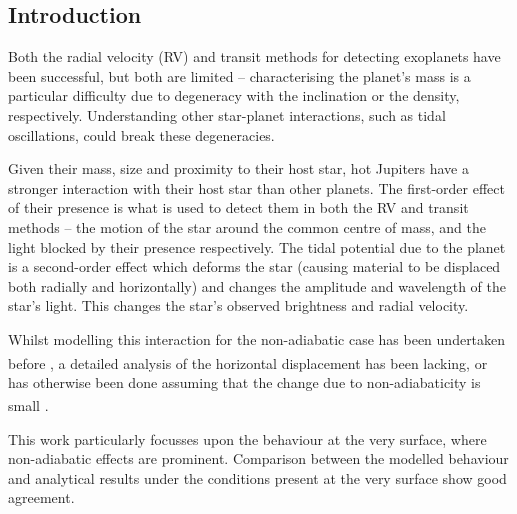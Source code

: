 \documentclass[a0,portrait]{a0poster}
\begin{document}
\begin{multicols}{2}
\begin{tcolorbox}[colframe=black,colback=blue!10!white]
\vspace{0.5cm}

\section*{Introduction}

Both the radial velocity (RV) and transit methods for detecting exoplanets have been successful, but both are limited -- characterising the planet's mass is a particular difficulty due to degeneracy with the inclination or the density, respectively. Understanding other star-planet interactions, such as tidal oscillations, could break these degeneracies.

Given their mass, size and proximity to their host star, hot Jupiters have a stronger interaction with their host star than other planets. The first-order effect of their presence is what is used to detect them in both the RV and transit methods -- the motion of the star around the common centre of mass, and the light blocked by their presence respectively. The tidal potential due to the planet is a second-order effect which deforms the star (causing material to be displaced both radially and horizontally) and changes the amplitude and wavelength of the star's light. This changes the star's observed brightness and radial velocity.

Whilst modelling this interaction for the non-adiabatic case has been undertaken before \textsuperscript{\cite{Pfahl2008}}, a detailed analysis of the horizontal displacement has been lacking, or has otherwise been done assuming that the change due to non-adiabaticity is small \textsuperscript{\cite{Terquem1998}}.

This work particularly focusses upon the behaviour at the very surface, where non-adiabatic effects are prominent. Comparison between the modelled behaviour and analytical results under the conditions present at the very surface show good agreement.

\vspace{0.5cm}

\end{tcolorbox}



\color{DarkSlateGray} %

\begin{tcolorbox}[colframe=black,colback=blue!10!white]


\end{tcolorbox}
\end{multicols}
\end{document}
